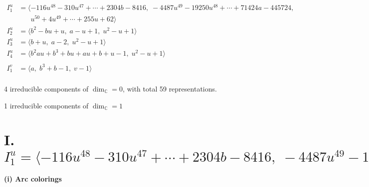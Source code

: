 \documentclass[1p]{elsarticle_modified}
\theoremstyle{definition}
\begin{document}
\begin{align*}
I^u_{1}&=\langle 
-116 u^{48}-310 u^{47}+\cdots+2304 b-8416,\;-4487 u^{49}-19250 u^{48}+\cdots+71424 a-445724,\\
\phantom{I^u_{1}}&\phantom{= \langle  }u^{50}+4 u^{49}+\cdots+255 u+62\rangle \\
I^u_{2}&=\langle 
b^2- b u+u,\;a- u+1,\;u^2- u+1\rangle \\
I^u_{3}&=\langle 
b+u,\;a-2,\;u^2- u+1\rangle \\
I^u_{4}&=\langle 
b^2 a u+b^3+b u+a u+b+u-1,\;u^2- u+1\rangle \\
\\
I^v_{1}&=\langle 
a,\;b^3+b-1,\;v-1\rangle \\
\end{align*}
\raggedright * 4 irreducible components of $\dim_{\mathbb{C}}=0$, with total 59 representations.\\
\raggedright * 1 irreducible components of $\dim_{\mathbb{C}}=1$ \\
\newpage
\renewcommand{\arraystretch}{1}
\centering \section*{I. $I^u_{1}= \langle -116 u^{48}-310 u^{47}+\cdots+2304 b-8416,\;-4487 u^{49}-19250 u^{48}+\cdots+71424 a-445724,\;u^{50}+4 u^{49}+\cdots+255 u+62 \rangle$}
\flushleft \textbf{(i) Arc colorings}\\
\end{document}
